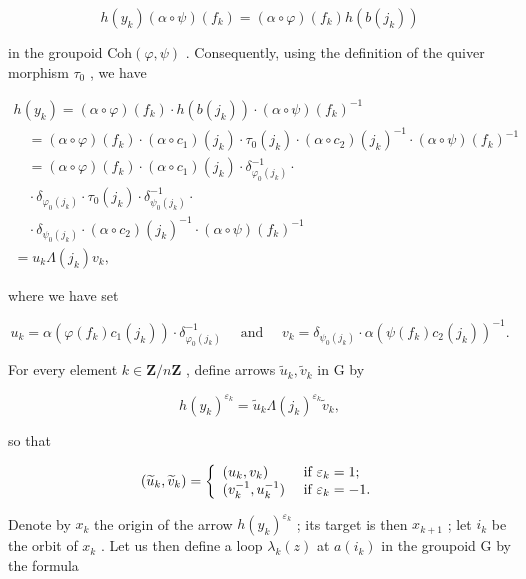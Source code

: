 \[
h (y _ {k}) (\alpha \circ \psi) (f _ {k}) = (\alpha \circ \varphi) (f _ {k}) h (b (j _ {k}))
\]

in the groupoid \(\mathrm{Coh}(\varphi,\psi)\) . Consequently, using the definition of the quiver morphism \(\tau_{0}\) , we have

\[
\begin{array}{l} h (y _ {k}) = (\alpha \circ \varphi) (f _ {k}) \cdot h (b (j _ {k})) \cdot (\alpha \circ \psi) (f _ {k}) ^ {- 1} \\ \quad = (\alpha \circ \varphi) (f _ {k}) \cdot (\alpha \circ c _ {1}) (j _ {k}) \cdot \tau_ {0} (j _ {k}) \cdot (\alpha \circ c _ {2}) (j _ {k}) ^ {- 1} \cdot (\alpha \circ \psi) (f _ {k}) ^ {- 1} \\ \quad = (\alpha \circ \varphi) (f _ {k}) \cdot (\alpha \circ c _ {1}) (j _ {k}) \cdot \delta_ {\varphi_ {0} (j _ {k})} ^ {- 1} \cdot \\ \quad \cdot \delta_ {\varphi_ {0} (j _ {k})} \cdot \tau_ {0} (j _ {k}) \cdot \delta_ {\psi_ {0} (j _ {k})} ^ {- 1} \cdot \\ \quad \cdot \delta_ {\psi_ {0} (j _ {k})} \cdot (\alpha \circ c _ {2}) (j _ {k}) ^ {- 1} \cdot (\alpha \circ \psi) (f _ {k}) ^ {- 1} \\ = u _ {k} \Lambda (j _ {k}) v _ {k}, \end{array}
\]

where we have set

\[
u _ {k} = \alpha (\varphi (f _ {k}) c _ {1} (j _ {k})) \cdot \delta_ {\varphi_ {0} (j _ {k})} ^ {- 1} \quad \text { and } \quad v _ {k} = \delta_ {\psi_ {0} (j _ {k})} \cdot \alpha (\psi (f _ {k}) c _ {2} (j _ {k})) ^ {- 1}.
\]

For every element \(k \in \mathbf{Z}/n\mathbf{Z}\) , define arrows \(\widetilde{u}_{k}, \widetilde{v}_{k}\) in G by

\[
h (y _ {k}) ^ {\varepsilon_ {k}} = \widetilde {u} _ {k} \Lambda (j _ {k}) ^ {\varepsilon_ {k}} \widetilde {v} _ {k},
\]

so that

\[
(\widetilde {u} _ {k}, \widetilde {v} _ {k}) = \left\{ \begin{array}{l l} (u _ {k}, v _ {k}) & \text { if } \varepsilon_ {k} = 1; \\ (v _ {k} ^ {- 1}, u _ {k} ^ {- 1}) & \text { if } \varepsilon_ {k} = - 1. \end{array} \right.
\]

Denote by \(x_{k}\) the origin of the arrow \(h(y_{k})^{\varepsilon_{k}}\) ; its target is then \(x_{k+1}\) ; let \(i_{k}\) be the orbit of \(x_{k}\) . Let us then define a loop \(\lambda_{k}(z)\) at \(a(i_{k})\) in the groupoid G by the formula

